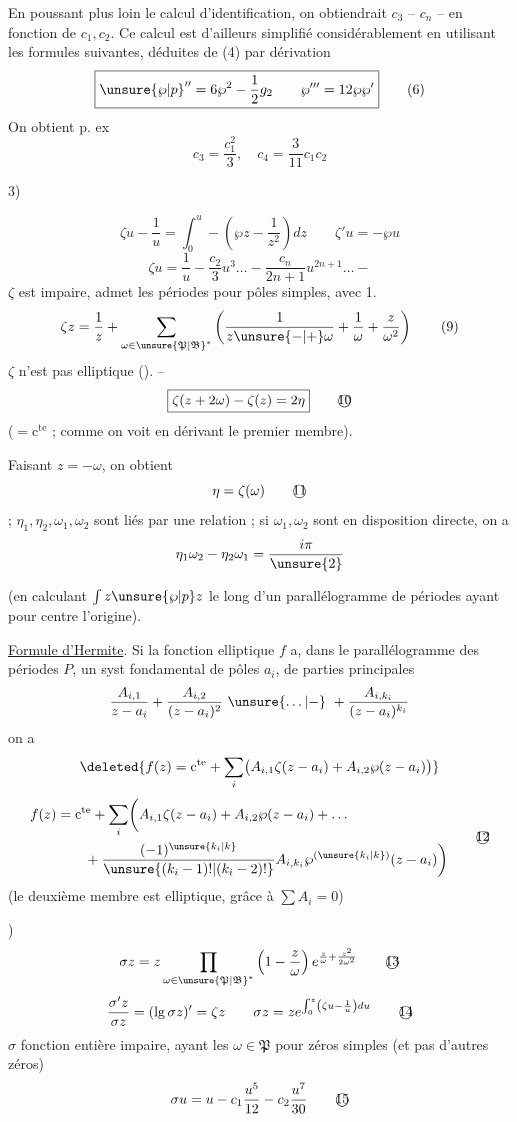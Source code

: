 En poussant plus loin le calcul d'identification, on obtiendrait $c_3$ -- $c_n$ -- en fonction de $c_1,c_2$. Ce calcul est d'ailleurs simplifié considérablement en utilisant les formules suivantes, déduites de (4) par dérivation
\[
\boxed{\mathord{\unsure{\wp|p}}''=6\wp^2-\frac12g_2\qquad\wp'''=12\wp\wp'}\tag*{(6)}
\]
On obtient p. ex
\[
\boxed{c_3=\frac{c_1^2}3,\quad c_4=\frac3{11}c_1c_2}\tag*{(7)}
\]

\noindent{} 3) 

\[
\zeta u-\frac1u=\int_0^u-\left(\wp z-\frac1{z^2}\right)dz\qquad\zeta'u=-\wp u\tag*{(7)}
\]
\[
\zeta u=\frac1u-\frac{c_2}{3}u^3\ldots-\frac{c_n}{2n+1}u^{2n+1}\ldots-\tag*{(8)}
\]
$\zeta$ est impaire, admet les périodes pour pôles simples, avec   1.
\[
\zeta z=\frac1z+\sum_{\omega\in{\unsure{\mathfrak P|\mathfrak B}}^{*}}\left(\frac1{z\unsure{-|+}\omega}+\frac1{\omega}+\frac{z}{\omega^2}\right)\tag*{(9)}
\]
$\zeta$ n'est pas elliptique (). --
\[
\boxed{\zeta(z+2\omega)-\zeta(z)=2\eta}\tag*{\textcircled{10}}
\]
($=\mathrm c^{\mathrm{te}}$ ; comme on voit en dérivant le premier membre).

Faisant $z=-\omega$, on obtient
\[
\eta=\zeta(\omega)\tag*{\textcircled{11}}
\]
; $\eta_1,\eta_2,\omega_1,\omega_2$ sont liés par une relation ; si $\omega_1,\omega_2$ sont en disposition directe, on a
\[
\eta_1\omega_2-\eta_2\omega_1=\frac{i\pi}{\unsure{2}}
\]

(en calculant $\int z\unsure{\wp|p}z$ le long d'un parallélogramme de périodes ayant pour centre l'origine).

\uline{Formule d'Hermite}. Si la fonction elliptique $f$ a, dans le parallélogramme des périodes $P$, un syst fondamental de pôles $a_i$, de parties principales
\[
\frac{A_{i,1}}{z-a_i}+\frac{A_{i,2}}{(z-a_i)^2}\ \unsure{\ldots|{-}}\ +\frac{A_{i,k_i}}{(z-a_i)^{k_i}}
\]
on a
\[
\deleted{f(z)=\mathrm c^{\mathrm{te}}+\sum_i\bigl(A_{i,1}\zeta(z-a_i)+A_{i,2}\wp(z-a_i)\bigr)}
\]
\[
\begin{aligned}
f(z)&=\mathrm c^{\mathrm{te}}+\sum_i\biggl(A_{i,1}\zeta(z-a_i)+A_{i,2}\wp(z-a_i)+\ldots\\
&\qquad+\frac{(-1)^{\unsure{k_i|k}}}{\unsure{(k_i-1)!|(k_i-2)!}}A_{i,k_i}\wp^{(\unsure{k_i|k})}(z-a_i)\biggr)
\end{aligned}\tag*{\textcircled{12}}
\]
(le deuxième membre est elliptique, grâce à $\sum A_i=0$)

) 
\[
\sigma z=z\prod_{\omega\in{\unsure{\mathfrak P|\mathfrak B}}^{*}}\left(1-\frac z\omega\right)e^{\frac z\omega+\frac{z^2}{2\omega^2}}\tag*{\textcircled{13}}
\]
\[
\frac{\sigma'z}{\sigma z}=(\lg\sigma z)'=\zeta z\qquad \sigma z=ze^{\int_0^z\left(\zeta u-\frac1u\right)du}\tag*{\textcircled{14}}
\]
$\sigma$ fonction entière impaire, ayant les $\omega\in\mathfrak P$ pour  zéros simples (et pas d'autres zéros)
\[
\sigma u=u-c_1\frac{u^5}{12}-c_2\frac{u^7}{30}\tag*{\textcircled{15}}
\]

